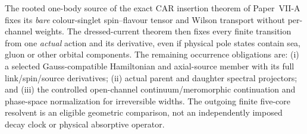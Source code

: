 \documentclass[12pt,a4paper]{article}
\begin{document}
\begin{remark}
\label{p11:rem:v375-action-current-remaining-edge}
The rooted one-body source of the exact CAR insertion theorem of Paper~VII-A
fixes its \emph{bare} colour-singlet spin--flavour tensor and Wilson
transport without per-channel weights. The dressed-current theorem
then fixes every finite transition from one \emph{actual} action and
its derivative, even if physical pole states contain sea, gluon or
other orbital components. The remaining occurrence obligations are:
(i) a selected Gauss-compatible Hamiltonian and axial-source member
with its full link/spin/source derivatives; (ii) actual parent and
daughter spectral projectors; and (iii) the controlled open-channel
continuum/meromorphic continuation and phase-space normalization for
irreversible widths. The outgoing finite five-core resolvent is an
eligible geometric comparison, not an independently imposed decay
clock or physical absorptive operator.
\end{remark}


\end{document}

